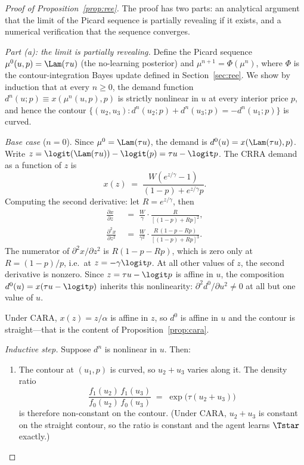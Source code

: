 \begin{proof}[Proof of Proposition~\ref{prop:ree}]
The proof has two parts: an analytical argument that the limit of the
Picard sequence is partially revealing if it exists, and a numerical
verification that the sequence converges.

\emph{Part (a): the limit is partially revealing.} Define the Picard
sequence $\mu^{0}(u,p)=\Lam(\tau u)$ (the no-learning posterior) and
$\mu^{n+1}=\Phi(\mu^{n})$, where $\Phi$ is the contour-integration
Bayes update defined in Section~\ref{sec:ree}. We show by induction
that at every $n\geq 0$, the demand function
$d^{n}(u;p)\equiv x(\mu^{n}(u,p),p)$ is strictly nonlinear in $u$ at
every interior price $p$, and hence the contour
$\{(u_{2},u_{3}):d^{n}(u_{2};p)+d^{n}(u_{3};p)=-d^{n}(u_{1};p)\}$ is
curved.

\emph{Base case} ($n=0$). Since $\mu^{0}=\Lam(\tau u)$, the demand is
$d^{0}(u)=x(\Lam(\tau u),p)$. Write $z=\logit(\Lam(\tau u))-\logit(p)
=\tau u-\logit p$. The CRRA demand as a function of $z$ is
\[
   x(z) \;=\; \frac{W(e^{z/\gamma}-1)}{(1-p)+e^{z/\gamma}p}.
\]
Computing the second derivative: let $R=e^{z/\gamma}$, then
\begin{align*}
   \frac{\partial x}{\partial z}
   &\;=\; \frac{W}{\gamma}\cdot\frac{R}{[(1-p)+Rp]^{2}}, \\
   \frac{\partial^{2} x}{\partial z^{2}}
   &\;=\; \frac{W}{\gamma^{2}}\cdot\frac{R\,(1-p-Rp)}{[(1-p)+Rp]^{3}}.
\end{align*}
The numerator of $\partial^{2}x/\partial z^{2}$ is $R(1-p-Rp)$, which
is zero only at $R=(1-p)/p$, i.e.\ at $z=-\gamma\logit p$. At all other
values of $z$, the second derivative is nonzero. Since $z=\tau u-\logit p$
is affine in $u$, the composition $d^{0}(u)=x(\tau u-\logit p)$ inherits
this nonlinearity: $\partial^{2}d^{0}/\partial u^{2}\neq 0$ at all but
one value of $u$.

Under CARA, $x(z)=z/\alpha$ is affine in $z$, so $d^{0}$ is affine in
$u$ and the contour is straight---that is the content of
Proposition~\ref{prop:cara}.

\emph{Inductive step.} Suppose $d^{n}$ is nonlinear in $u$. Then:
\begin{enumerate}[label=(\roman*),topsep=2pt,itemsep=2pt]
\item The contour at $(u_{1},p)$ is curved, so $u_{2}+u_{3}$ varies along
it. The density ratio
\[
   \frac{f_{1}(u_{2})\,f_{1}(u_{3})}{f_{0}(u_{2})\,f_{0}(u_{3})}
   \;=\; \exp\!\bigl(\tau(u_{2}+u_{3})\bigr)
\]
is therefore non-constant on the contour. (Under CARA, $u_{2}+u_{3}$ is
constant on the straight contour, so the ratio is constant and the
agent learns $\Tstar$ exactly.)


\end{enumerate}
\end{proof}
